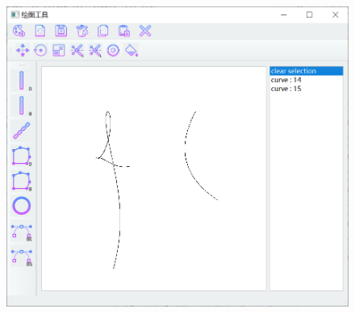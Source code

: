 \documentclass[a4paper,UTF8]{article}
\theoremstyle{definition}
\begin{document}
\begin{figure}[H]
	\includegraphics[width=5in,height=4in]{curve.png}
\end{figure}
\end{document}
